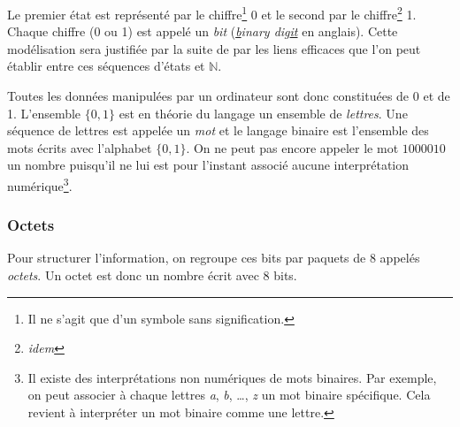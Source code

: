 \documentclass[../../main.tex]{subfiles}
\begin{document}
Le premier état est représenté par le chiffre\footnote{Il ne s'agit que d'un symbole sans signification.} 0 et le second par le chiffre\footnote{\textit{idem}} 1. Chaque chiffre (0 ou 1) est appelé un \textit{bit} (\textit{\underline{b}inary dig\underline{it}} en anglais). Cette modélisation sera justifiée par la suite de par les liens efficaces que l'on peut établir entre ces séquences d'états et $\mathbb{N}$.

Toutes les données manipulées par un ordinateur sont donc constituées de 0 et de 1. L'ensemble $\{0, 1\}$ est en théorie du langage un ensemble de \textit{lettres}. Une séquence de lettres est appelée un \textit{mot} et le langage binaire est l'ensemble des mots écrits avec l'alphabet $\{0, 1\}$. On ne peut pas encore appeler le mot $1000010$ un nombre puisqu'il ne lui est pour l'instant associé aucune interprétation numérique\footnote{Il existe des interprétations non numériques de mots binaires. Par exemple, on peut associer à chaque lettres \textit{a}, \textit{b}, \dots, \textit{z} un mot binaire spécifique. Cela revient à interpréter un mot binaire comme une lettre.}.
\subsubsection{Octets}
Pour structurer l'information, on regroupe ces bits par paquets de 8 appelés \textit{octets}. Un octet est donc un nombre écrit avec 8 bits.
\end{document}
